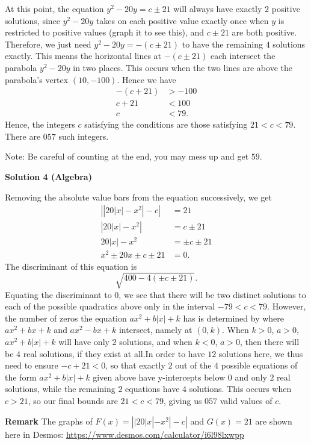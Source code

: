 \begin{enumerate}
 At this point, the equation $y^2-20y = c \pm 21$ will always have exactly $2$ positive solutions, since $y^2-20y$ takes on each positive value exactly once when $y$ is restricted to positive values (graph it to see this), and $c \pm 21$ are both positive. Therefore, we just need $y^2-20y = -(c \pm 21)$ to have the remaining $4$ solutions exactly. This means the horizontal lines at $-(c \pm 21)$ each intersect the parabola $y^2 - 20y$ in two places. This occurs when the two lines are above the parabola's vertex $(10,-100)$. Hence we have
 \begin{align*} -(c + 21) &> -100 \\ c + 21 &< 100 \\ c &< 79. \end{align*}
Hence, the integers $c$ satisfying the conditions are those satisfying $21 < c < 79.$ There are $\boxed{057}$ such integers.

 Note: Be careful of counting at the end, you may mess up and get $59$.

 



\textbf{Solution 4 (Algebra)}

Removing the absolute value bars from the equation successively, we get
 \begin{align*} \left|\left|20|x|-x^2\right|-c\right|&=21 \\ \left|20|x|-x^2\right|&= c \pm21 \\ 20|x|-x^2 &= \pm c \pm 21 \\ x^2 \pm 20x \pm c \pm21 &= 0. \end{align*}
The discriminant of this equation is
 \[\sqrt{400-4(\pm c \pm 21)}.\]Equating the discriminant to $0$, we see that there will be two distinct solutions to each of the possible quadratics above only in the interval $-79 < c < 79$. However, the number of zeros the equation $ax^2+b|x|+k$ has is determined by where $ax^2+bx+k$ and $ax^2-bx+k$ intersect, namely at $(0,k)$. When $k>0$, $a>0$, $ax^2+b|x|+k$ will have only $2$ solutions, and when $k<0$, $a>0$, then there will be $4$ real solutions, if they exist at all.In order to have $12$ solutions here, we thus need to ensure $-c+21<0$, so that exactly $2$ out of the $4$ possible equations of the form $ax^2+b|x|+k$ given above have y-intercepts below $0$ and only $2$ real solutions, while the remaining $2$ equations have $4$ solutions. This occurs when $c>21$, so our final bounds are $21<c<79$, giving us $\boxed{057}$ valid values of $c$.

 \textbf{Remark} The graphs of $F(x)=\left||20|x|-x^2|-c\right|$ and $G(x)=21$ are shown here in Desmos: \href{https://www.desmos.com/calculator/i6l98lxwpp}{https://www.desmos.com/calculator/i6l98lxwpp}


\end{enumerate}
